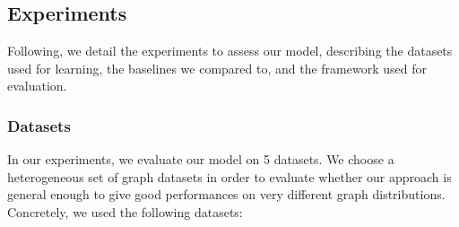 \subsection{Experiments}
Following, we detail the experiments to assess our model, describing the datasets used for learning, the baselines we compared to, and the framework used for evaluation.

\subsubsection*{Datasets}\label{sec:datasets}
In our experiments, we evaluate our model on 5 datasets. We choose a heterogeneous set of graph datasets in order to evaluate whether our approach is general enough to give good performances on very different graph distributions. Concretely, we used the following datasets:

